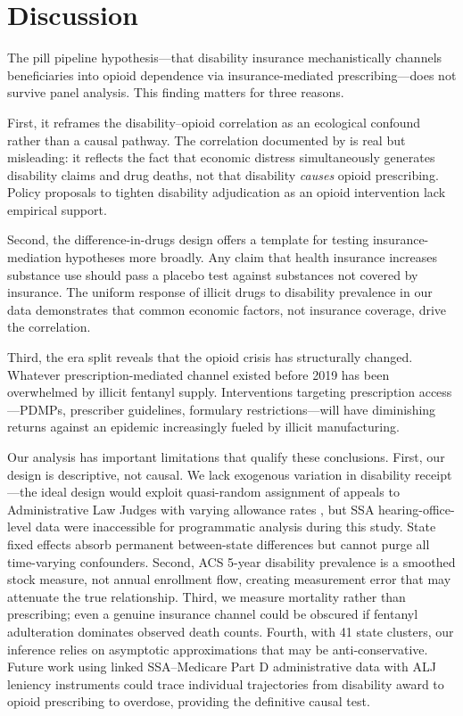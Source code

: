 \documentclass[12pt]{article}
\begin{document}
\section{Discussion}

The pill pipeline hypothesis---that disability insurance mechanistically channels beneficiaries into opioid dependence via insurance-mediated prescribing---does not survive panel analysis. This finding matters for three reasons.

First, it reframes the disability--opioid correlation as an ecological confound rather than a causal pathway. The correlation documented by \citet{lazo2021} is real but misleading: it reflects the fact that economic distress simultaneously generates disability claims and drug deaths, not that disability \textit{causes} opioid prescribing. Policy proposals to tighten disability adjudication as an opioid intervention lack empirical support.

Second, the difference-in-drugs design offers a template for testing insurance-mediation hypotheses more broadly. Any claim that health insurance increases substance use should pass a placebo test against substances not covered by insurance. The uniform response of illicit drugs to disability prevalence in our data demonstrates that common economic factors, not insurance coverage, drive the correlation.

Third, the era split reveals that the opioid crisis has structurally changed. Whatever prescription-mediated channel existed before 2019 has been overwhelmed by illicit fentanyl supply. Interventions targeting prescription access---PDMPs, prescriber guidelines, formulary restrictions---will have diminishing returns against an epidemic increasingly fueled by illicit manufacturing.

Our analysis has important limitations that qualify these conclusions. First, our design is descriptive, not causal. We lack exogenous variation in disability receipt---the ideal design would exploit quasi-random assignment of appeals to Administrative Law Judges with varying allowance rates \citep{maestas2013}, but SSA hearing-office-level data were inaccessible for programmatic analysis during this study. State fixed effects absorb permanent between-state differences but cannot purge all time-varying confounders. Second, ACS 5-year disability prevalence is a smoothed stock measure, not annual enrollment flow, creating measurement error that may attenuate the true relationship. Third, we measure mortality rather than prescribing; even a genuine insurance channel could be obscured if fentanyl adulteration dominates observed death counts. Fourth, with 41 state clusters, our inference relies on asymptotic approximations that may be anti-conservative. Future work using linked SSA--Medicare Part D administrative data with ALJ leniency instruments could trace individual trajectories from disability award to opioid prescribing to overdose, providing the definitive causal test.
\end{document}
